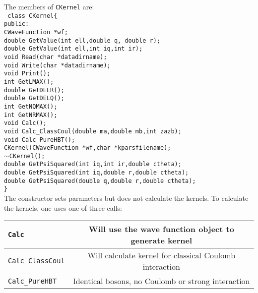 \documentclass[10pt]{article}
\def\tab{\hspace*{9pt}}
\begin{document}
The members of {\tt CKernel} are:\\
{\tt
class CKernel\{\\
\tab public:\\
\tab \tab  CWaveFunction *wf;\\
\tab \tab  double GetValue(int ell,double q, double r);\\
\tab \tab  double GetValue(int ell,int iq,int ir);\\
\tab \tab  void Read(char *datadirname);\\
\tab \tab  void Write(char *datadirname);\\
\tab \tab  void Print();\\
\tab \tab  int GetLMAX();\\
\tab \tab  double GetDELR();\\
\tab \tab  double GetDELQ();\\
\tab \tab  int GetNQMAX();\\
\tab \tab  int GetNRMAX();\\
\tab \tab  void Calc();\\
\tab \tab  void Calc\_ClassCoul(double ma,double mb,int zazb);\\
\tab \tab  void Calc\_PureHBT();\\
\tab \tab  CKernel(CWaveFunction *wf,char *kparsfilename);\\
\tab \tab  $\sim$CKernel();\\
\tab \tab  double GetPsiSquared(int iq,int ir,double ctheta);\\
\tab \tab  double GetPsiSquared(int iq,double r,double ctheta);\\
\tab \tab  double GetPsiSquared(double q,double r,double ctheta);\\
\}\\ }
The constructor sets parameters but does not calculate the kernels. To calculate the kernels, one uses one of three calls:
\begin{center}
\begin{tabular}{|l|c|}\hline
{\tt Calc} & Will use the wave function object to generate kernel\\ \hline
{\tt Calc\_ClassCoul} & Will calculate kernel for classical Coulomb interaction \\ \hline
{\tt Calc\_PureHBT} & Identical bosons, no Coulomb or strong interaction\\ \hline
\end{tabular}
\end{center}
\end{document}
